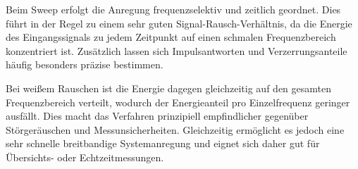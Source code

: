 Beim Sweep erfolgt die Anregung frequenzselektiv und zeitlich geordnet. Dies führt in der Regel zu einem sehr guten Signal-Rausch-Verhältnis, da die Energie des Eingangssignals zu jedem Zeitpunkt auf einen schmalen Frequenzbereich konzentriert ist. Zusätzlich lassen sich Impulsantworten und Verzerrungsanteile häufig besonders präzise bestimmen.

Bei weißem Rauschen ist die Energie dagegen gleichzeitig auf den gesamten Frequenzbereich verteilt, wodurch der Energieanteil pro Einzelfrequenz geringer ausfällt. Dies macht das Verfahren prinzipiell empfindlicher gegenüber Störgeräuschen und Messunsicherheiten. Gleichzeitig ermöglicht es jedoch eine sehr schnelle breitbandige Systemanregung und eignet sich daher gut für Übersichts- oder Echtzeitmessungen.


\newpage
